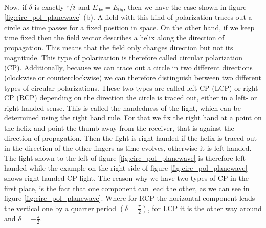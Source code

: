 Now, if $\delta$ is exactly $\nicefrac{\pi}{2}$ and $E_{0x} = E_{0y}$, then we have the case shown in figure \ref{fig:circ_pol_planewave} (b). A field with this kind of polarization traces out a circle as time passes for a fixed position in space. On the other hand, if we keep time fixed then the field vector describes a helix along the direction of propagation. This means that the field only changes direction but not its magnitude. This type of polarization is therefore called circular polarization (CP). Additionally, because we can trace out a circle in two different directions (clockwise or counterclockwise) we can therefore distinguish between two different types of circular polarizations. These two types are called left CP (LCP) or right CP (RCP) depending on the direction the circle is traced out, either in a left- or right-handed sense. This is called the handedness of the light, which can be determined using the right hand rule. For that we fix the right hand at a point on the helix and point the thumb away from the receiver, that is against the direction of propagation. Then the light is right-handed if the helix is traced out in the direction of the other fingers as time evolves, otherwise it is left-handed. The light shown to the left of figure \ref{fig:circ_pol_planewave} is therefore left-handed while the example on the right side of figure \ref{fig:circ_pol_planewave} shows right-handed CP light. The reason why we have two types of CP in the first place, is the fact that one component can lead the other, as we can see in figure \ref{fig:circ_pol_planewave}. Where for RCP the horizontal component leads the vertical one by a quarter period $\left(\delta = \frac{\pi}{2}\right)$, for LCP it is the other way around and $\delta = -\frac{\pi}{2}$. 


